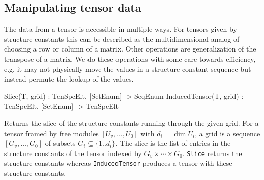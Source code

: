 \subsection{Manipulating tensor data}
The data from a tensor is accessible in multiple ways.   For 
tensors given by structure constants this can be described as the 
multidimensional analog of choosing a row or column of a matrix.
Other operations are generalization of the transpose of a matrix.
We do these operations with some care towards efficiency,
e.g. it may not physically move the values in a structure constant
sequence but instead permute the lookup of the values.


\begin{intrinsics}
Slice(T, grid) : TenSpcElt, [SetEnum] -> SeqEnum
InducedTensor(T, grid) : TenSpcElt, [SetEnum] -> TenSpcElt
\end{intrinsics}

Returns the slice of the structure constants running through the given grid. 
For a tensor framed by free modules $[U_v,\dots,U_0]$ with $d_i=\dim U_i$, 
a grid is a sequence $[G_v,\dots,G_0]$ of subsets $G_i\subseteq \{1..d_i\}$.
The slice is the list of entries in the structure constants of the tensor
indexed by $G_v\times \cdots \times G_0$. {\tt Slice} returns the structure
constants whereas {\tt InducedTensor} produces a tensor with these
structure constants. 

